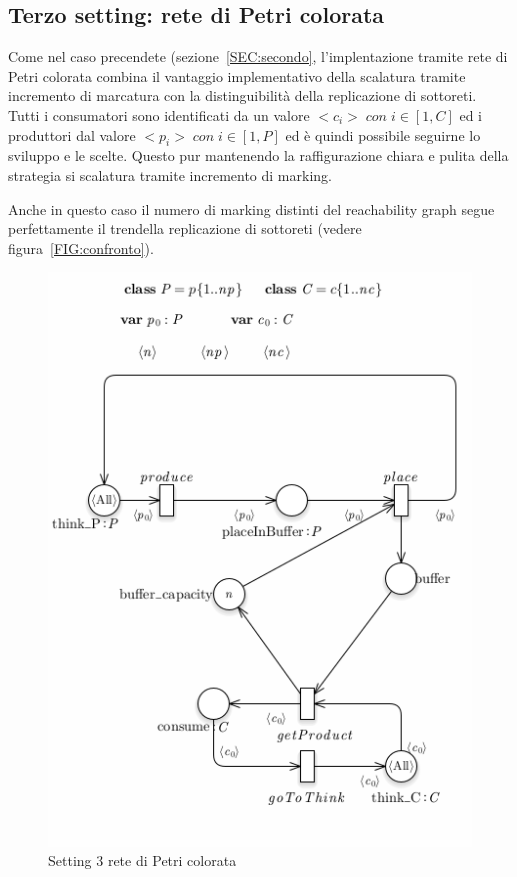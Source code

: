 \documentclass{article}
\begin{document}
\subsection{Terzo setting: rete di Petri colorata}
Come nel caso precendete (sezione~\ref{SEC:secondo}, l'implentazione tramite rete di Petri colorata combina il vantaggio implementativo della scalatura tramite incremento di marcatura con la distinguibilità della replicazione di sottoreti.\\
Tutti i consumatori sono identificati da un valore $<c_i> \; con \; i \in [1,C]$ ed i produttori dal valore $<p_i> \; con \; i \in [1,P]$ ed è quindi possibile seguirne lo sviluppo e le scelte.
Questo pur mantenendo la raffigurazione chiara e pulita della strategia si scalatura tramite incremento di marking.

Anche in questo caso il numero di marking distinti del reachability graph segue perfettamente il trendella replicazione di sottoreti (vedere figura~\ref{FIG:confronto}).
\begin{figure}[!ht]
\centering
\centerline{\includegraphics[scale=0.5]{./Esercizio2_img/setting_3_CPN.png}}
\caption{Setting 3 rete di Petri colorata} \label{FIG:setting3_CPN}
\end{figure}\\
\end{document}
